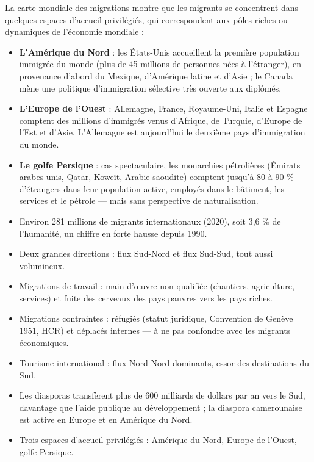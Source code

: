 \documentclass[11pt]{article}
\newcommand{\cle}[1]{{\popxbold\color{popdark}#1}}
\newcounter{popsec}
\newcounter{popsub}
\newcommand{\courssub}[1]{%
  \stepcounter{popsub}%
  \par\vspace{9pt}\noindent{\popxbold\fontsize{11.5}{13}\selectfont\color{popink}{\color{poporange}\thepopsec.\thepopsub}\hspace{6pt}#1}\par\nopagebreak\vspace{4pt}
}
\begin{document}
\courssub{Les espaces d'accueil privilégiés}

La carte mondiale des migrations montre que les migrants se concentrent dans quelques \cle{espaces d'accueil privilégiés}, qui correspondent aux pôles riches ou dynamiques de l'économie mondiale :

\begin{itemize}
\item \textbf{L'Amérique du Nord} : les États-Unis accueillent la première population immigrée du monde (plus de 45 millions de personnes nées à l'étranger), en provenance d'abord du Mexique, d'Amérique latine et d'Asie ; le Canada mène une politique d'immigration sélective très ouverte aux diplômés.
\item \textbf{L'Europe de l'Ouest} : Allemagne, France, Royaume-Uni, Italie et Espagne comptent des millions d'immigrés venus d'Afrique, de Turquie, d'Europe de l'Est et d'Asie. L'Allemagne est aujourd'hui le deuxième pays d'immigration du monde.
\item \textbf{Le golfe Persique} : cas spectaculaire, les monarchies pétrolières (Émirats arabes unis, Qatar, Koweït, Arabie saoudite) comptent jusqu'à 80 à 90 \% d'étrangers dans leur population active, employés dans le bâtiment, les services et le pétrole — mais sans perspective de naturalisation.
\end{itemize}

\begin{aretenir}
\begin{itemize}
\item Environ \cle{281 millions de migrants internationaux} (2020), soit 3,6 \% de l'humanité, un chiffre en forte hausse depuis 1990.
\item Deux grandes directions : flux \cle{Sud-Nord} et flux \cle{Sud-Sud}, tout aussi volumineux.
\item Migrations de travail : main-d'œuvre non qualifiée (chantiers, agriculture, services) et \cle{fuite des cerveaux} des pays pauvres vers les pays riches.
\item Migrations contraintes : \cle{réfugiés} (statut juridique, Convention de Genève 1951, HCR) et déplacés internes — à ne pas confondre avec les migrants économiques.
\item Tourisme international : flux \cle{Nord-Nord} dominants, essor des destinations du Sud.
\item Les \cle{diasporas} transfèrent plus de 600 milliards de dollars par an vers le Sud, davantage que l'aide publique au développement ; la diaspora camerounaise est active en Europe et en Amérique du Nord.
\item Trois espaces d'accueil privilégiés : Amérique du Nord, Europe de l'Ouest, golfe Persique.
\end{itemize}
\end{aretenir}
\end{document}
